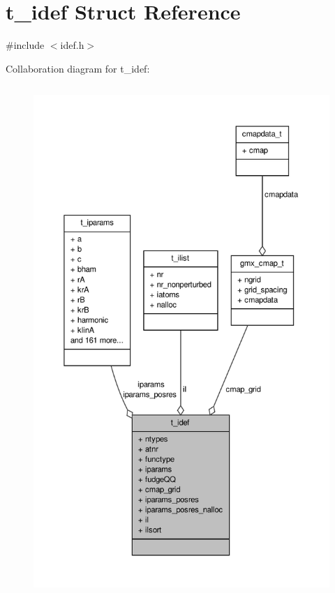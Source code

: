 \hypertarget{structt__idef}{\section{t\-\_\-idef \-Struct \-Reference}
\label{structt__idef}
}


{\ttfamily \#include $<$idef.\-h$>$}



\-Collaboration diagram for t\-\_\-idef\-:
\nopagebreak
\begin{figure}[H]
\begin{center}
\leavevmode
\includegraphics[height=550pt]{structt__idef__coll__graph}
\end{center}
\end{figure}
